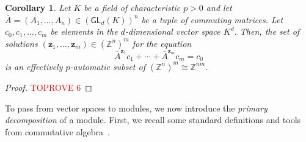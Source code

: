 \documentclass[a4paper,UKenglish,cleveref, autoref, thm-restate]{lipics-v2021}
\newcommand{\Z}{\mathbb{Z}}
\newcommand{\GL}{\mathsf{GL}}
\newcommand{\bz}{\boldsymbol{z}}
\newcommand{\oA}{\overline{A}}
\newtheorem{cor}[thrm]{Corollary}
\theoremstyle{definition}
\theoremstyle{definition}
\theoremstyle{definition}
\begin{document}
\begin{cor}\label{cor:MordellLang}
    Let $K$ be a field of characteristic $p > 0$ and let $\oA = (A_1, \ldots, A_n) \in \left(\GL_d(K)\right)^n$ be a tuple of commuting matrices.
    Let $c_0, c_1, \ldots, c_m$ be elements in the $d$-dimensional vector space $K^d$.
    Then, the set of solutions $(\bz_1, \ldots, \bz_m) \in \left(\Z^{n}\right)^{m}$ for the equation
    \begin{equation}\label{eq:Sunitfield}
        \oA^{\bz_1} c_1 + \cdots + \oA^{\bz_m} c_m = c_0
    \end{equation}
    is an effectively $p$-automatic subset of $\left(\Z^{n}\right)^{m} \cong \Z^{nm}$.
\end{cor}
\begin{proof}\textcolor{red}{TOPROVE 6}\end{proof}

To pass from vector spaces to modules, we now introduce the \emph{primary decomposition} of a module.
First, we recall some standard definitions and tools from commutative algebra~\cite{eisenbud2013commutative}.
\end{document}
